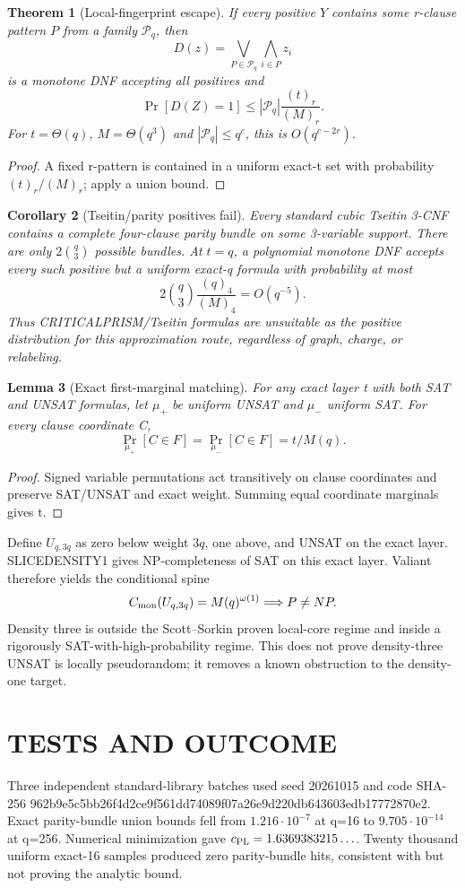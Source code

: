 \documentclass[11pt]{article}
\newtheorem{theorem}{Theorem}
\newtheorem{lemma}[theorem]{Lemma}
\newtheorem{corollary}[theorem]{Corollary}
\begin{document}
\begin{theorem}[Local-fingerprint escape]
If every positive $Y$ contains some r-clause pattern $P$ from a family $\mathcal P_q$, then
\[
D(z)=\bigvee_{P\in\mathcal P_q}\bigwedge_{i\in P}z_i
\]
is a monotone DNF accepting all positives and
\[
\Pr[D(Z)=1]\le |\mathcal P_q|\frac{(t)_r}{(M)_r}.
\]
For $t=\Theta(q)$, $M=\Theta(q^3)$ and $|\mathcal P_q|\le q^c$, this is $O(q^{c-2r})$.
\end{theorem}
\begin{proof}
A fixed r-pattern is contained in a uniform exact-t set with probability $(t)_r/(M)_r$; apply a union bound.
\end{proof}

\begin{corollary}[Tseitin/parity positives fail]
Every standard cubic Tseitin 3-CNF contains a complete four-clause parity bundle on some 3-variable support. There are only $2\binom q3$ possible bundles. At $t=q$, a polynomial monotone DNF accepts every such positive but a uniform exact-q formula with probability at most
\[
2\binom q3\frac{(q)_4}{(M)_4}=O(q^{-5}).
\]
Thus CRITICALPRISM/Tseitin formulas are unsuitable as the positive distribution for this approximation route, regardless of graph, charge, or relabeling.
\end{corollary}

\begin{lemma}[Exact first-marginal matching]
For any exact layer t with both SAT and UNSAT formulas, let $\mu_+$ be uniform UNSAT and $\mu_-$ uniform SAT. For every clause coordinate C,
\[
\Pr_{\mu_+}[C\in F]=\Pr_{\mu_-}[C\in F]=t/M(q).
\]
\end{lemma}
\begin{proof}
Signed variable permutations act transitively on clause coordinates and preserve SAT/UNSAT and exact weight. Summing equal coordinate marginals gives t.
\end{proof}

Define $U_{q,3q}$ as zero below weight $3q$, one above, and UNSAT on the exact layer. SLICEDENSITY1 gives NP-completeness of SAT on this exact layer. Valiant therefore yields the conditional spine
\[
C_{\rm mon}(U_{q,3q})=M(q)^{\omega(1)}\Longrightarrow P\ne NP.
\]
Density three is outside the Scott--Sorkin proven local-core regime and inside a rigorously SAT-with-high-probability regime. This does not prove density-three UNSAT is locally pseudorandom; it removes a known obstruction to the density-one target.

\section{TESTS AND OUTCOME}
Three independent standard-library batches used seed 20261015 and code SHA-256 962b9e5c5bb26f4d2ce9f561dd74089f07a26e9d220db643603edb17772870e2. Exact parity-bundle union bounds fell from $1.216\cdot10^{-7}$ at q=16 to $9.705\cdot10^{-14}$ at q=256. Numerical minimization gave $c_{\rm PL}=1.6369383215\ldots$. Twenty thousand uniform exact-16 samples produced zero parity-bundle hits, consistent with but not proving the analytic bound.
\end{document}
